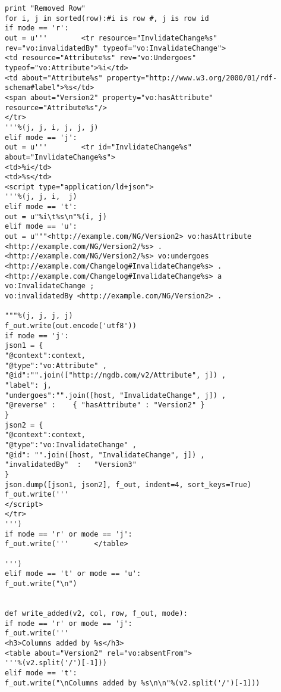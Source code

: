 \begin{verbatim}
print "Removed Row"
for i, j in sorted(row):#i is row #, j is row id
if mode == 'r':
out = u'''        <tr resource="InvlidateChange%s" rev="vo:invalidatedBy" typeof="vo:InvalidateChange">
<td resource="Attribute%s" rev="vo:Undergoes" typeof="vo:Attribute">%i</td>
<td about="Attribute%s" property="http://www.w3.org/2000/01/rdf-schema#label">%s</td>
<span about="Version2" property="vo:hasAttribute" resource="Attribute%s"/>
</tr>
'''%(j, j, i, j, j, j)
elif mode == 'j':
out = u'''        <tr id="InvlidateChange%s" about="InvlidateChange%s">
<td>%i</td>
<td>%s</td>
<script type="application/ld+json">
'''%(j, j, i,  j)
elif mode == 't':
out = u"%i\t%s\n"%(i, j)
elif mode == 'u':
out = u"""<http://example.com/NG/Version2> vo:hasAttribute <http://example.com/NG/Version2/%s> .
<http://example.com/NG/Version2/%s> vo:undergoes <http://example.com/Changelog#InvalidateChange%s> .
<http://example.com/Changelog#InvalidateChange%s> a vo:InvalidateChange ;
vo:invalidatedBy <http://example.com/NG/Version2> .

"""%(j, j, j, j)
f_out.write(out.encode('utf8'))
if mode == 'j':
json1 = {
"@context":context,
"@type":"vo:Attribute" ,
"@id":"".join(["http://ngdb.com/v2/Attribute", j]) ,
"label": j,
"undergoes":"".join([host, "InvalidateChange", j]) ,
"@reverse" :    { "hasAttribute" : "Version2" }
}
json2 = {
"@context":context,
"@type":"vo:InvalidateChange" ,
"@id": "".join([host, "InvalidateChange", j]) ,
"invalidatedBy"  :   "Version3"
}
json.dump([json1, json2], f_out, indent=4, sort_keys=True)
f_out.write('''
</script>
</tr>
''')
if mode == 'r' or mode == 'j':
f_out.write('''      </table>

''')
elif mode == 't' or mode == 'u':
f_out.write("\n")


def write_added(v2, col, row, f_out, mode):
if mode == 'r' or mode == 'j':
f_out.write('''
<h3>Columns added by %s</h3>
<table about="Version2" rel="vo:absentFrom">
'''%(v2.split('/')[-1]))
elif mode == 't':
f_out.write("\nColumns added by %s\n\n"%(v2.split('/')[-1]))


\end{verbatim}
